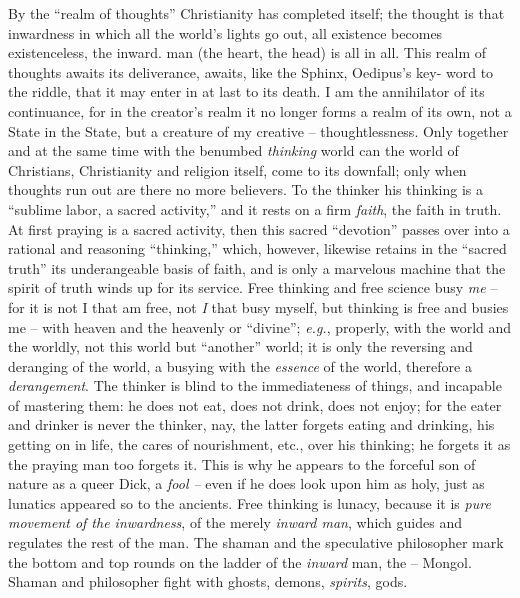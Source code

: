 By the ``realm of thoughts'' Christianity has completed itself; the thought 
is that inwardness in which all the world's lights go out, all existence 
becomes existenceless, the inward. man (the heart, the head) is all in all. 
This realm of thoughts awaits its deliverance, awaits, like the Sphinx, 
Oedipus's key- word to the riddle, that it may enter in at last to its death. 
I am the annihilator of its continuance, for in the creator's realm it no 
longer forms a realm of its own, not a State in the State, but a creature of 
my creative -- thoughtlessness. Only together and at the same time with the 
benumbed \textit{thinking} world can the world of Christians, Christianity and 
religion itself, come to its downfall; only when thoughts run out are there no 
more believers. To the thinker his thinking is a ``sublime labor, a sacred 
activity,'' and it rests on a firm \textit{faith}, the faith in truth. At 
first praying is a sacred activity, then this sacred ``devotion'' passes 
over into a rational and reasoning ``thinking,'' which, however, likewise 
retains in the ``sacred truth'' its underangeable basis of faith, and is 
only a marvelous machine that the spirit of truth winds up for its service. 
Free thinking and free science busy \textit{me} -- for it is not I that am 
free, not \textit{I} that busy myself, but thinking is free and busies me -- 
with heaven and the heavenly or ``divine''; \textit{e.g.}, properly, with 
the world and the worldly, not this world but ``another'' world; it is only 
the reversing and deranging of the world, a busying with the \textit{essence} 
of the world, therefore a \textit{derangement}. The thinker is blind to the 
immediateness of things, and incapable of mastering them: he does not eat, 
does not drink, does not enjoy; for the eater and drinker is never the 
thinker, nay, the latter forgets eating and drinking, his getting on in life, 
the cares of nourishment, etc., over his thinking; he forgets it as the 
praying man too forgets it. This is why he appears to the forceful son of 
nature as a queer Dick, a \textit{fool --} even if he does look upon him as 
holy, just as lunatics appeared so to the ancients. Free thinking is lunacy, 
because it is \textit{pure movement of the inwardness}, of the merely 
\textit{inward man}, which guides and regulates the rest of the man. The 
shaman and the speculative philosopher mark the bottom and top rounds on the 
ladder of the \textit{inward} man, the -- Mongol. Shaman and philosopher fight 
with ghosts, demons, \textit{spirits}, gods.

